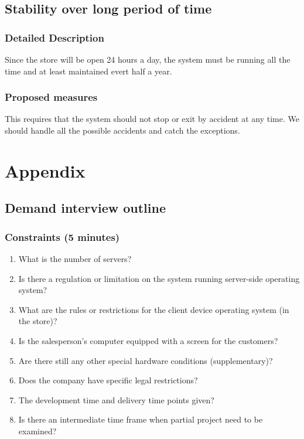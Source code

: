 \documentclass[a4paper]{report}
\begin{document}
\section{Stability over long period of time}
\subsection{Detailed Description}
Since the store will be open 24 hours a day, the system must be running all the time and at least maintained evert half a year.
\subsection{Proposed measures}
This requires that the system should not stop or exit by accident at any time. We should handle all the possible accidents and catch the exceptions.

\chapter{Appendix}
\section{Demand interview outline}
\subsection{Constraints (5 minutes)}
\begin{enumerate}
\item What is the number of servers? 
\item Is there a regulation or limitation on the system running server-side operating system? 
\item What are the rules or restrictions for the client device operating system (in the store)? 
\item Is the salesperson's computer equipped with a screen for the customers?
\item Are there still any other special hardware conditions (supplementary)? 
\item Does the company have specific legal restrictions? 
\item The development time and delivery time points given? 
\item Is there an intermediate time frame when partial project need to be examined?
\end{enumerate}
\end{document}
